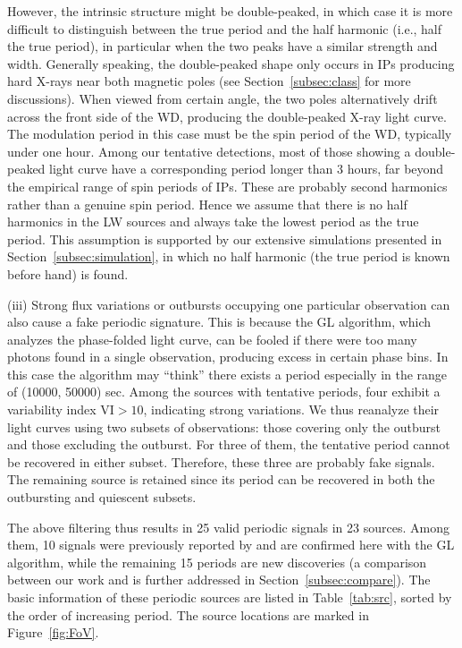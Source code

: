 \documentclass[fleqn,usenatbib]{mnras}
\begin{document}
However, the intrinsic structure might be double-peaked, in which case it is more difficult to distinguish between the true period and the half harmonic (i.e., half the true period), in particular when the two peaks have a similar strength and width.
Generally speaking, the double-peaked shape only occurs in IPs producing hard X-rays near both magnetic poles (see Section~\ref{subsec:class} for more discussions). When viewed from certain angle, the two poles alternatively drift across the front side of the WD, producing the double-peaked X-ray light curve. The modulation period in this case must be the spin period of the WD, typically under one hour. Among our tentative detections, most of those showing a double-peaked light curve have a corresponding period longer than 3 hours, far beyond the empirical range of spin periods of IPs. 
These are probably second harmonics rather than a genuine spin period. 
Hence we assume that there is no half harmonics in the LW sources and always take the lowest period as the true period. This assumption is supported by our extensive simulations presented in Section~\ref{subsec:simulation}, in which no half harmonic (the true period is known before hand) is found.  

(iii) Strong flux variations or outbursts occupying one particular observation can also cause a fake periodic signature. This is because the GL algorithm, which analyzes the phase-folded light curve, can be fooled if there were too many photons found in a single observation, producing excess in certain phase bins. In this case the algorithm may ``think'' there exists a period especially in the range of (10000, 50000) sec. Among the sources with tentative periods, four exhibit a variability index VI$>10$, indicating strong variations. We thus reanalyze their light curves using two subsets of observations: those covering only the outburst and those excluding the outburst. For three of them, the tentative period cannot be recovered in either subset. Therefore, these three are probably fake signals. The remaining source is retained since its period can be recovered in both the outbursting and quiescent subsets.

The above filtering thus results in 25 valid periodic signals in 23 sources.
Among them, 10 signals were previously reported by \citet{2012ApJ...746..165H} and are confirmed here with the GL algorithm, while the remaining 15 periods are new discoveries (a comparison between our work and \citealp{2012ApJ...746..165H} is further addressed in Section~\ref{subsec:compare}). 
The basic information of these periodic sources are listed in Table~\ref{tab:src}, sorted by the order of increasing period. The source locations are marked in Figure~\ref{fig:FoV}.
\end{document}
